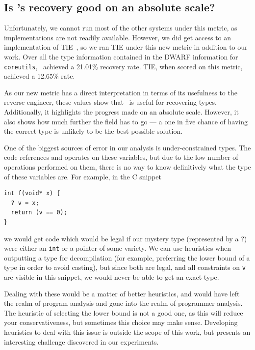 \subsection{Is \bitr's recovery good on an absolute scale?}
Unfortunately, we cannot run most of the other systems under this metric, as implementations are not readily available. However, we did get access to an implementation of TIE~\cite{tie}, so we ran TIE under this new metric in addition to our work. Over all the type information contained in the DWARF information for \texttt{coreutils}, \bitr\ achieved a 21.01\% recovery rate. TIE, when scored on this metric, achieved a 12.65\% rate.

As our new metric has a direct interpretation in terms of its usefulness to the reverse engineer, these values show that \bitr\ is useful for recovering types. Additionally, it highlights the progress made on an absolute scale. However, it also shows how much further the field has to go --- a one in five chance of having the correct type is unlikely to be the best possible solution.

One of the biggest sources of error in our analysis is under-constrained types. The code references and operates on these variables, but due to the low number of operations performed on them, there is no way to know definitively what the type of these variables are. For example, in the C snippet
\begin{verbatim}
int f(void* x) {
  ? v = x;
  return (v == 0);
}
\end{verbatim}
we would get code which would be legal if our mystery type (represented by a ?) were either an \texttt{int} or a pointer of some variety. We can use heuristics when outputting a type for decompilation (for example, preferring the lower bound of a type in order to avoid casting), but since both are legal, and all constraints on \texttt{v} are visible in this snippet, we would never be able to get an exact type.

Dealing with these would be a matter of better heuristics, and would have left the realm of program analysis and gone into the realm of programmer analysis. The heuristic of selecting the lower bound is not a good one, as this will reduce your conservativeness, but sometimes this choice may make sense. Developing heuristics to deal with this issue is outside the scope of this work, but presents an interesting challenge discovered in our experiments.

